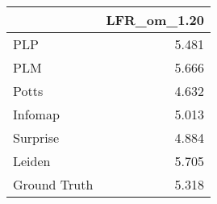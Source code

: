 \begin{tabular}{lr}
\toprule
{} & LFR_om_1.20 \\
\midrule
PLP          &       5.481 \\
PLM          &       5.666 \\
Potts        &       4.632 \\
Infomap      &       5.013 \\
Surprise     &       4.884 \\
Leiden       &       5.705 \\
Ground Truth &       5.318 \\
\bottomrule
\end{tabular}
